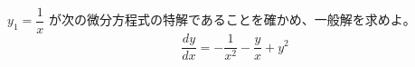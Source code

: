 
$y_{1} = \dfrac{1}{x}$ が次の微分方程式の特解であることを確かめ、一般解を求めよ。
\[
\frac{dy}{dx} = -\frac{1}{x^{2}} - \frac{y}{x} + y^{2}
\]
